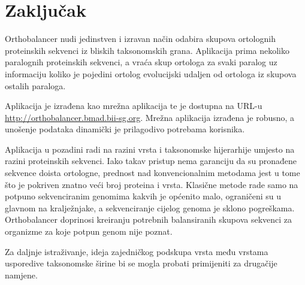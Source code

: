\chapter{Zaključak}
\label{chap:zakljucak}

Orthobalancer nudi jedinstven i izravan način odabira skupova ortolognih
proteinskih sekvenci iz bliskih taksonomskih grana. Aplikacija prima nekoliko
paralognih proteinskih sekvenci, a vraća skup ortologa za svaki paralog uz
informaciju koliko je pojedini ortolog evolucijski udaljen od ortologa iz
skupova ostalih paraloga.

Aplikacija je izrađena kao mrežna aplikacija te je dostupna na URL-u
\footnotesize{\url{http://orthobalancer.bmad.bii-sg.org}}. \normalsize
Mrežna aplikacija izrađena je robusno, a unošenje podataka dinamički je
prilagodivo potrebama korisnika.

Aplikacija u pozadini radi na razini vrsta i taksonomske hijerarhije umjesto na
razini proteinskih sekvenci. Iako takav pristup nema garanciju da su pronađene
sekvence doista ortologne, prednost nad konvencionalnim metodama jest u tome što
je pokriven znatno veći broj proteina i vrsta. Klasične metode rade samo na
potpuno sekvenciranim genomima kakvih je općenito malo, ograničeni su u glavnom
na kralježnjake, a sekvenciranje cijelog genoma je sklono pogreškama.
Orthobalancer doprinosi kreiranju potrebnih balansiranih skupova sekvenci za
organizme za koje potpun genom nije poznat.

Za daljnje istraživanje, ideja zajedničkog podskupa vrsta među vrstama
usporedive taksonomske širine bi se mogla probati primijeniti za drugačije
namjene.


